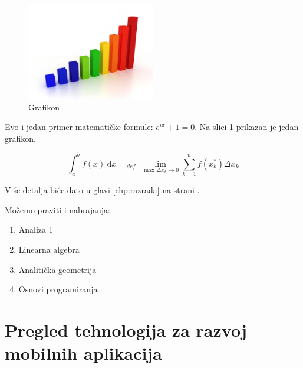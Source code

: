 \documentclass[12pt,oneside]{memoir}
\begin{document}
\begin{figure}[!ht]
  \centering
  \label{fig:grafikon}
  \includegraphics[width=0.5\textwidth]{graph.png}
  \caption{Grafikon}
\end{figure}


Evo i jedan primer matematičke formule: $e^{i\pi} + 1 = 0$. 
Na slici \ref{fig:grafikon} prikazan je jedan grafikon.

$$
\int_a^b f(x)\ \mathrm{d}x \ =_{def}\ \lim_{\max{\Delta x_k \rightarrow 0}} \sum_{k=1}^n f(x_k^*)\Delta x_k
$$

Više detalja biće dato u glavi \ref{chp:razrada} na strani \pageref{chp:razrada}.

Možemo praviti i nabrajanja:
\begin{enumerate}
\item Analiza 1
\item Linearna algebra
\item Analitička geometrija
\item Osnovi programiranja
\end{enumerate}

\pangrami

\chapter{Pregled tehnologija za razvoj mobilnih aplikacija}
\label{chp:pregledTehnologijaZaRazvojMobilnihAplikacija}
\end{document}
